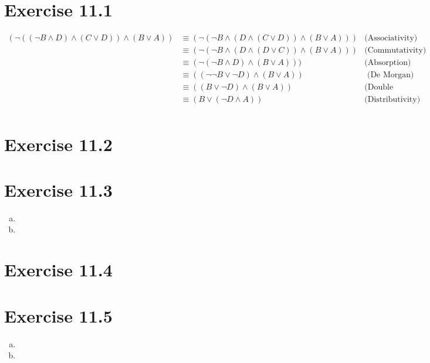 \documentclass{article} %
\newcommand{\homeworkNumber}{11}
\begin{document}
\section*{Exercise \homeworkNumber.1}
\begin{align*}
	(\neg((\neg B \land D) \land (C \lor D)) \land (B \lor A)) & \equiv (\neg(\neg B \land (D \land (C \lor D)) \land (B \lor A))) & \text{(Associativity)}    \\
	                                                           & \equiv (\neg(\neg B \land (D \land (D \lor C)) \land (B \lor A))) & \text{(Commutativity) }   \\
	                                                           & \equiv (\neg(\neg B \land D) \land (B \lor A)))                   & \text{(Absorption) }      \\
	                                                           & \equiv ((\neg\neg B \lor \neg D) \land (B \lor A))                & \text{ (De Morgan) }      \\
	                                                           & \equiv ((B \lor \neg D) \land (B \lor A))                         & \text{(Double Negation) } \\
	                                                           & \equiv (B \lor ( \neg D \land A))                                 & \text{(Distributivity) }  \\
\end{align*}


\section*{Exercise \homeworkNumber.2}




\section*{Exercise \homeworkNumber.3}
\begin{enumerate}[(a)]
	\item
	\item
\end{enumerate}



\section*{Exercise \homeworkNumber.4}



\section*{Exercise \homeworkNumber.5}
\begin{enumerate}[(a)]
	\item
	\item
\end{enumerate}
\end{document}
